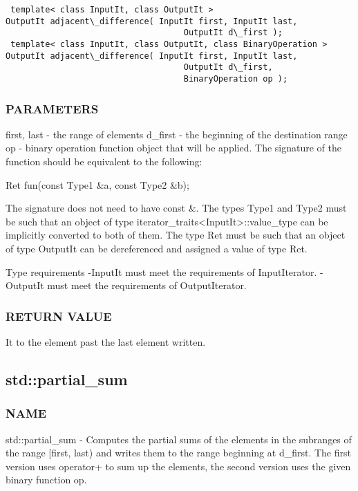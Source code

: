 \begin{lstlisting}
 template< class InputIt, class OutputIt >
OutputIt adjacent\_difference( InputIt first, InputIt last,
                                    OutputIt d\_first );
 template< class InputIt, class OutputIt, class BinaryOperation >
OutputIt adjacent\_difference( InputIt first, InputIt last,
                                    OutputIt d\_first,
                                    BinaryOperation op );
\end{lstlisting}

\subsubsection{PARAMETERS}
first, last - the range of elements
d\_first - the beginning of the destination range
op - binary operation function object that will be applied.
The signature of the function should be equivalent to the following:

 Ret fun(const Type1 \&a, const Type2 \&b);

The signature does not need to have const \&. The types Type1 and Type2 must be such that an object of type iterator\_traits<InputIt>::value\_type can be implicitly converted to both of them. The type Ret must be such that an object of type OutputIt can be dereferenced and assigned a value of type Ret.

 Type requirements
 -InputIt must meet the requirements of InputIterator.
 -OutputIt must meet the requirements of OutputIterator.

\subsubsection{RETURN VALUE}
It to the element past the last element written.



\subsection{std::partial\_sum}

\subsubsection{NAME}
std::partial\_sum - Computes the partial sums of the elements in the subranges of the range [first, last) and writes them to the range beginning at d\_first. The first version uses operator+ to sum up the elements, the second version uses the given binary function op.

